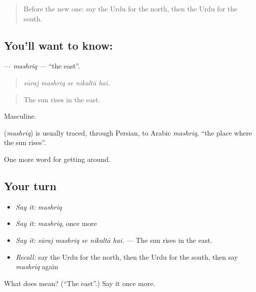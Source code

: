 \begin{quote}
Before the new one: say the Urdu for the north, then the Urdu for the south.
\end{quote}

\subsection*{You'll want to know: }
\textbf{} — \emph{mashriq} — \textquotedblleft{}the east\textquotedblright{}.

\begin{quote}
    
\end{quote}

\begin{quote}
\emph{sūraj mashriq se nikaltā hai.}
\end{quote}

\begin{quote}
The sun rises in the east.
\end{quote}

Masculine.

\begin{cousinweb}
\textbf{} (\emph{mashriq}) is usually traced, through Persian, to Arabic \emph{mashriq}, \textquotedblleft{}the place where the sun rises\textquotedblright{}.
\end{cousinweb}

\begin{grammarlens}[title={What you've built}]
One more word for getting around.
\end{grammarlens}

\subsection*{Your turn}
\begin{itemize}
\raggedright
  \item \emph{Say it:} \emph{mashriq}
  \item \emph{Say it:} \emph{mashriq}, once more
  \item \emph{Say it:} \emph{sūraj mashriq se nikaltā hai.} — The sun rises in the east.
  \item \emph{Recall:} say the Urdu for the north, then the Urdu for the south, then say \emph{mashriq} again
\end{itemize}

\begin{tcolorbox}[breakable,colback=teal!4,colframe=teal!35!black,title={Before you move on}]
What does  mean? (\textquotedblleft{}The east\textquotedblright{}.) Say it once more.
\end{tcolorbox}
